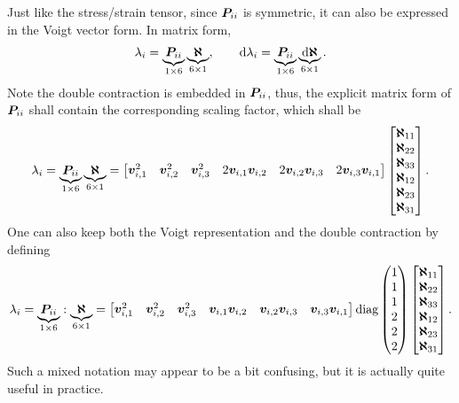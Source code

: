 Just like the stress/strain tensor, since $\bm{P}_{ii}$ is symmetric, it can also be expressed in the Voigt vector form.
In matrix form,
\begin{gather}
    \lambda_i=\underbrace{\bm{P}_{ii}}_{1\times6}\underbrace{\bm{\aleph}}_{6\times1},\qquad
    \mathrm{d}\lambda_i=\underbrace{\bm{P}_{ii}}_{1\times6}\underbrace{\mathrm{d}\bm{\aleph}}_{6\times1}.
\end{gather}
Note the double contraction is embedded in $\bm{P}_{ii}$, thus, the explicit matrix form of $\bm{P}_{ii}$ shall contain the corresponding scaling factor, which shall be
\begin{gather}
    \lambda_i=\underbrace{\bm{P}_{ii}}_{1\times6}\underbrace{\bm{\aleph}}_{6\times1}=\begin{bmatrix}
        \bm{v}_{i,1}^2 & \bm{v}_{i,2}^2 & \bm{v}_{i,3}^2 & 2\bm{v}_{i,1}\bm{v}_{i,2} & 2\bm{v}_{i,2}\bm{v}_{i,3} & 2\bm{v}_{i,3}\bm{v}_{i,1}
    \end{bmatrix}\begin{bmatrix}
        \bm{\aleph}_{11} \\\bm{\aleph}_{22}\\\bm{\aleph}_{33}\\\bm{\aleph}_{12}\\\bm{\aleph}_{23}\\\bm{\aleph}_{31}
    \end{bmatrix}.
\end{gather}
One can also keep both the Voigt representation and the double contraction by defining
\begin{gather}
    \lambda_i=\underbrace{\bm{P}_{ii}}_{1\times6}:\underbrace{\bm{\aleph}}_{6\times1}=\begin{bmatrix}
        \bm{v}_{i,1}^2 & \bm{v}_{i,2}^2 & \bm{v}_{i,3}^2 & \bm{v}_{i,1}\bm{v}_{i,2} & \bm{v}_{i,2}\bm{v}_{i,3} & \bm{v}_{i,3}\bm{v}_{i,1}
    \end{bmatrix}\text{diag}\left(\begin{matrix}1\\1\\1\\2\\2\\2\end{matrix}\right)\begin{bmatrix}
        \bm{\aleph}_{11} \\\bm{\aleph}_{22}\\\bm{\aleph}_{33}\\\bm{\aleph}_{12}\\\bm{\aleph}_{23}\\\bm{\aleph}_{31}
    \end{bmatrix}.
\end{gather}
Such a mixed notation may appear to be a bit confusing, but it is actually quite useful in practice.

